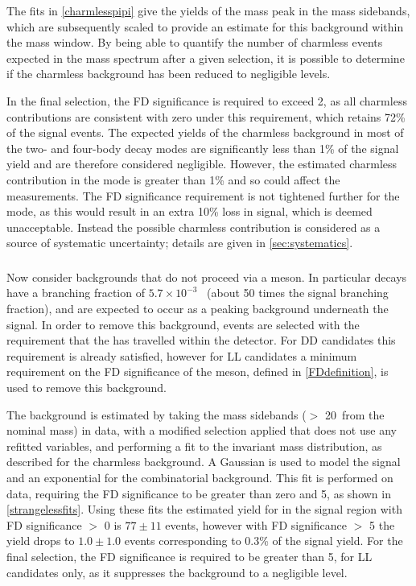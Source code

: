 The fits in \fig\ref{charmlesspipi} give the yields of the \Bm mass peak in the \Dz mass sidebands, which are subsequently scaled to provide an estimate for this background within the \Dz mass window. By being able to quantify the number of charmless events expected in the \Bm mass spectrum after a given selection, it is possible to determine if the charmless background has been reduced to negligible levels. 

In the final selection, the \Dz FD significance is required to exceed 2, as all charmless contributions are consistent with zero under this requirement, which retains 72\% of the signal events. The expected yields of the charmless background in most of the two- and four-body \Dz decay modes are significantly less than 1\% of the signal yield and are therefore considered negligible. However, the estimated charmless contribution in the \pipi mode is greater than 1\% and so could affect the measurements. The \Dz FD significance requirement is not tightened further for the \pipi mode, as this would result in an extra 10\% loss in signal, which is deemed unacceptable. Instead the possible charmless contribution is considered as a source of systematic uncertainty; details are given in \sect\ref{sec:systematics}. 

\subsubsection{\boldmath \decay{\Bm}{\D\pim\pip\pim}}
\label{sec:backgrounds:b2dpipipi}

Now consider backgrounds that do not proceed via a \KS meson. In particular \decay{\Bm}{\D\pim\pip\pim} decays have a branching fraction of $5.7 \times 10^{-3}$~\cite{PDG2016} (about 50 times the signal \decay{\Bm}{\D\Kstarm(\KS(\pip\pim)\pim)} branching fraction), and are expected to occur as a peaking background underneath the signal. In order to remove this background, events are selected with the requirement that the \KS has travelled within the detector. For DD candidates this requirement is already satisfied, however for LL candidates a minimum requirement on the FD significance of the \KS meson, defined in \eqn\ref{FDdefinition}, is used to remove this background. 

The \decay{\Bm}{\D\pim\pip\pim} background is estimated by taking the \KS mass sidebands ($>$ 20~\mevcc from the nominal \KS mass) in data, with a modified selection applied that does not use any refitted variables, and performing a fit to the invariant \Bm mass distribution, as described for the charmless background. A Gaussian is used to model the signal and an exponential for the combinatorial background. This fit is performed on \kpi data, requiring the \KS FD significance to be greater than zero and 5, as shown in \fig\ref{strangelessfits}. Using these fits the estimated \decay{\Bm}{\D\pim\pip\pim} yield for \runtwo in the signal region with \KS FD significance $>$ 0 is $77 \pm 11$ events, however with \KS FD significance $>$ 5 the yield drops to $1.0 \pm 1.0$ events corresponding to 0.3\% of the signal yield. For the final selection, the \KS FD significance is required to be greater than 5, for LL candidates only, as it suppresses the \decay{\Bm}{\D\pim\pip\pim} background to a negligible level.

